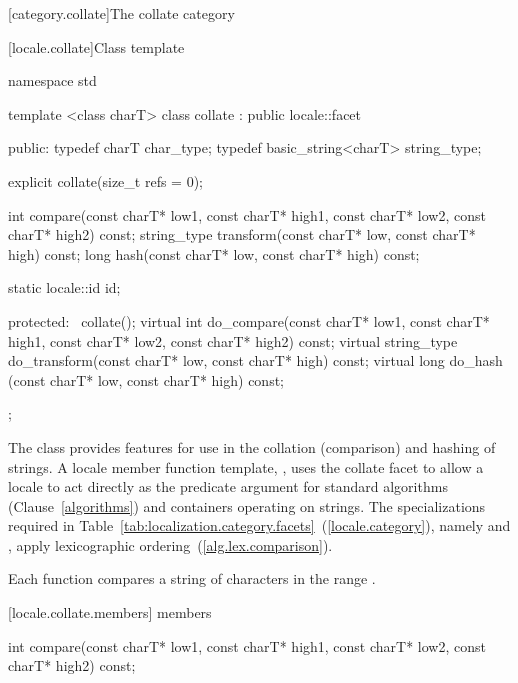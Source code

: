 [category.collate]{The collate category}

[locale.collate]{Class template }

%
\begin{codeblock}
namespace std {
  template <class charT>
  class collate : public locale::facet {
  public:
    typedef charT               char_type;
    typedef basic_string<charT> string_type;

    explicit collate(size_t refs = 0);

    int compare(const charT* low1, const charT* high1,
                const charT* low2, const charT* high2) const;
    string_type transform(const charT* low, const charT* high) const;
    long hash(const charT* low, const charT* high) const;

    static locale::id id;

  protected:
    ~collate();
    virtual int do_compare(const charT* low1, const charT* high1,
                           const charT* low2, const charT* high2) const;
    virtual string_type do_transform(const charT* low, const charT* high) const;
    virtual long do_hash (const charT* low, const charT* high) const;
  };
}
\end{codeblock}

\pnum
The class
provides features for use in the
collation (comparison) and hashing of strings.
A locale member function template,
,
uses the collate facet to allow a locale to act directly as the predicate
argument for standard algorithms (Clause~\ref{algorithms}) and containers operating on strings.
The specializations required in Table~\ref{tab:localization.category.facets}~(\ref{locale.category}), namely
and
,
apply lexicographic ordering~(\ref{alg.lex.comparison}).

\pnum
Each function compares a string of characters
in the range
.

[locale.collate.members]{ members}

%
%
\begin{itemdecl}
int compare(const charT* low1, const charT* high1,
            const charT* low2, const charT* high2) const;
\end{itemdecl}

\begin{itemdescr}
\pnum
\returns
{}
\end{itemdescr}

